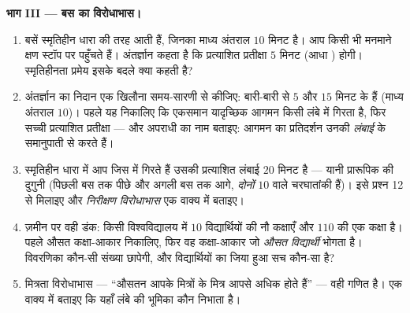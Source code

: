 \begin{problem}
\medskip
\noindent\textbf{भाग III --- बस का विरोधाभास।}
\begin{enumerate}[resume]
  \item बसें स्मृतिहीन धारा की तरह आती हैं, जिनका माध्य अंतराल $10$ मिनट
        है। आप किसी भी मनमाने क्षण स्टॉप पर पहुँचते हैं। अंतर्ज्ञान कहता है
        कि प्रत्याशित प्रतीक्षा $5$ मिनट (आधा ) होगी। स्मृतिहीनता
        प्रमेय इसके बदले क्या कहती है?
  \item अंतर्ज्ञान का निदान एक खिलौना समय-सारणी से कीजिए:  बारी-बारी
        से $5$ और $15$ मिनट के हैं (माध्य अंतराल $10$)। पहले यह
         निकालिए कि एकसमान यादृच्छिक आगमन किसी लंबे  में
        गिरता है, फिर सच्ची प्रत्याशित प्रतीक्षा --- और अपराधी का नाम बताइए:
        आगमन  का प्रतिदर्शन उनकी \emph{लंबाई} के समानुपाती
         से करते हैं।
  \item स्मृतिहीन धारा में आप जिस  में गिरते हैं उसकी प्रत्याशित लंबाई
        $20$ मिनट है --- यानी प्रारूपिक  की दुगुनी (पिछली बस तक पीछे
        और अगली बस तक आगे, \emph{दोनों}  $10$ वाले चरघातांकी हैं)। इसे
        प्रश्न 12 से मिलाइए और \emph{निरीक्षण विरोधाभास} एक वाक्य में बताइए।
  \item ज़मीन पर वही डंक: किसी विश्वविद्यालय में $10$ विद्यार्थियों की नौ
        कक्षाएँ और $110$ की एक कक्षा है। पहले औसत कक्षा-आकार निकालिए, फिर वह
        कक्षा-आकार जो \emph{औसत विद्यार्थी} भोगता है। विवरणिका कौन-सी संख्या
        छापेगी, और विद्यार्थियों का जिया हुआ सच कौन-सा है?
  \item मित्रता विरोधाभास --- ``औसतन आपके मित्रों के मित्र आपसे अधिक होते
        हैं'' --- वही गणित है। एक वाक्य में बताइए कि यहाँ लंबे  की
        भूमिका कौन निभाता है।
\end{enumerate}


\end{problem}

